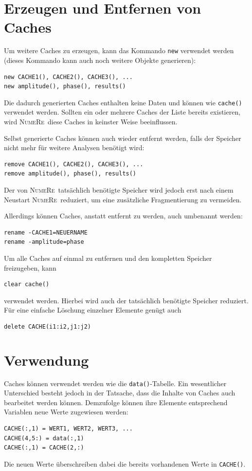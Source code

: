 \documentclass[DIV=14,headsepline,footsepline]{scrbook}
\newcommand{\NR}{\textsc{Nu\-me\-Re}}
\begin{document}
			\section{Erzeugen und Entfernen von Caches}
				Um weitere Caches zu erzeugen, kann das Kommando \lstinline+new+ verwendet werden (dieses Kommando kann auch noch weitere Objekte generieren):
				\begin{lstlisting}
new CACHE1(), CACHE2(), CACHE3(), ...
new amplitude(), phase(), results()
				\end{lstlisting}
				Die dadurch generierten Caches enthalten keine Daten und können wie \lstinline+cache()+ verwendet werden. Sollten ein oder mehrere Caches der Liste bereits existieren, wird \NR\ diese Caches in keinster Weise beeinflussen.
				
				Selbst generierte Caches können auch wieder entfernt werden, falls der Speicher nicht mehr für weitere Analysen benötigt wird:
				\begin{lstlisting}
remove CACHE1(), CACHE2(), CACHE3(), ...
remove amplitude(), phase(), results()
				\end{lstlisting}
				Der von \NR\ tatsächlich benötigte Speicher wird jedoch erst nach einem Neustart \NR\ reduziert, um eine zusätzliche Fragmentierung zu vermeiden.
				
				Allerdings können Caches, anstatt entfernt zu werden, auch umbenannt werden:
				\begin{lstlisting}
rename -CACHE1=NEUERNAME
rename -amplitude=phase
				\end{lstlisting}
				
				Um alle Caches auf einmal zu entfernen und den kompletten Speicher freizugeben, kann 
				\begin{lstlisting}
clear cache()
				\end{lstlisting}
				verwendet werden. Hierbei wird auch der tatsächlich benötigte Speicher reduziert. Für eine einfache Löschung einzelner Elemente genügt auch 
				\begin{lstlisting}
delete CACHE(i1:i2,j1:j2)
				\end{lstlisting}
				
			\section{Verwendung}
				Caches können verwendet werden wie die \lstinline+data()+-Tabelle. Ein wesentlicher Unterschied besteht jedoch in der Tatsache, dass die Inhalte von Caches auch bearbeitet werden können. Demzufolge können ihre Elemente entsprechend Variablen neue Werte zugewiesen werden:
				\begin{lstlisting}
CACHE(:,1) = WERT1, WERT2, WERT3, ...
CACHE(4,5:) = data(:,1)
CACHE(:,1) = CACHE(2,:)
				\end{lstlisting}
				Die neuen Werte überschreiben dabei die bereits vorhandenen Werte in \lstinline+CACHE()+.
				
\end{document}

